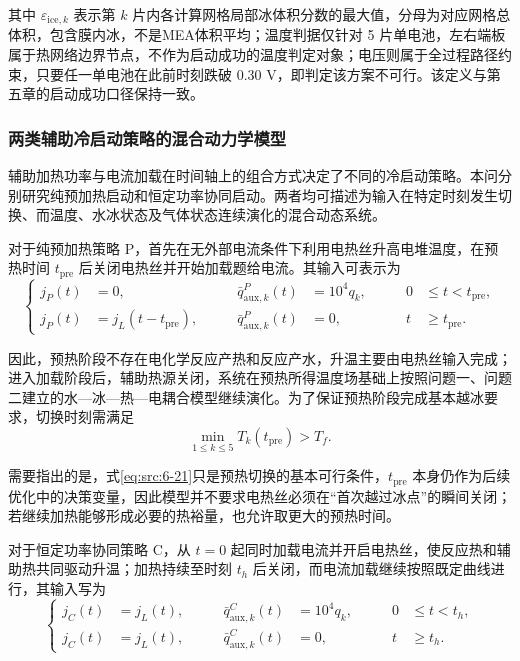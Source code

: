 \documentclass[bwprint]{gmcmthesis}
\numberwithin{equation}{section}
\numberwithin{figure}{section}
\begin{document}
 其中 \(\varepsilon_{\mathrm{ice},k}\) 表示第 \(k\) 片内各计算网格局部冰体积分数的最大值，分母为对应网格总体积，包含膜内冰，不是MEA体积平均；温度判据仅针对 5 片单电池，左右端板属于热网络边界节点，不作为启动成功的温度判定对象；电压则属于全过程路径约束，只要任一单电池在此前时刻跌破 0.30 V，即判定该方案不可行。该定义与第五章的启动成功口径保持一致。

\subsubsection{两类辅助冷启动策略的混合动力学模型}

 辅助加热功率与电流加载在时间轴上的组合方式决定了不同的冷启动策略。本问分别研究纯预加热启动和恒定功率协同启动。两者均可描述为输入在特定时刻发生切换、而温度、水冰状态及气体状态连续演化的混合动态系统。

 对于纯预加热策略 P，首先在无外部电流条件下利用电热丝升高电堆温度，在预热时间 \(t_{\text{pre}}\) 后关闭电热丝并开始加载题给电流。其输入可表示为
\begin{equation}
\left\{
\begin{aligned}
j_P(t) &= 0, \qquad & \bar{q}_{\text{aux},k}^P(t) &= 10^4 q_k, \qquad & 0 &\leq t < t_{\text{pre}}, \\
j_P(t) &= j_L(t - t_{\text{pre}}), \qquad & \bar{q}_{\text{aux},k}^P(t) &= 0, \qquad & t &\geq t_{\text{pre}}.
\end{aligned}
\right.
\label{eq:src:6-20}
\end{equation}

 因此，预热阶段不存在电化学反应产热和反应产水，升温主要由电热丝输入完成；进入加载阶段后，辅助热源关闭，系统在预热所得温度场基础上按照问题一、问题二建立的水—冰—热—电耦合模型继续演化。为了保证预热阶段完成基本越冰要求，切换时刻需满足
\begin{equation}
\min_{1 \leq k \leq 5} T_k(t_{\text{pre}}) > T_f. \label{eq:src:6-21}
\end{equation}

 需要指出的是，式\eqref{eq:src:6-21}只是预热切换的基本可行条件，\(t_{\text{pre}}\) 本身仍作为后续优化中的决策变量，因此模型并不要求电热丝必须在“首次越过冰点”的瞬间关闭；若继续加热能够形成必要的热裕量，也允许取更大的预热时间。

 对于恒定功率协同策略 C，从 \(t = 0\) 起同时加载电流并开启电热丝，使反应热和辅助热共同驱动升温；加热持续至时刻 \(t_h\) 后关闭，而电流加载继续按照既定曲线进行，其输入写为
\begin{equation}
\left\{
\begin{aligned}
j_C(t) &= j_L(t), \qquad & \bar{q}_{\text{aux},k}^C(t) &= 10^4 q_k, \qquad & 0 &\leq t < t_h, \\
j_C(t) &= j_L(t), \qquad & \bar{q}_{\text{aux},k}^C(t) &= 0, \qquad & t &\geq t_h.
\end{aligned}
\right.
\label{eq:src:6-22}
\end{equation}
\end{document}
